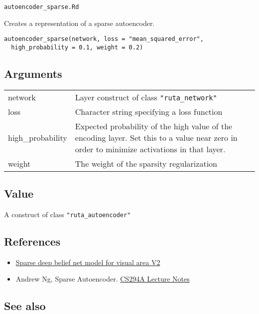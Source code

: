 \texttt{autoencoder\_sparse.Rd}

Creates a representation of a sparse autoencoder.

\begin{verbatim}
autoencoder_sparse(network, loss = "mean_squared_error",
  high_probability = 0.1, weight = 0.2)
\end{verbatim}

\hypertarget{arguments}{\subsection{\texorpdfstring{\protect\hyperlink{arguments}{}Arguments}{Arguments}}\label{arguments}}

\begin{longtable}[c]{@{}ll@{}}
\toprule
network & Layer construct of class
\texttt{"ruta\_network"}\tabularnewline
loss & Character string specifying a loss function\tabularnewline
high\_probability & Expected probability of the high value of the
encoding layer. Set this to a value near zero in order to minimize
activations in that layer.\tabularnewline
weight & The weight of the sparsity regularization\tabularnewline
\bottomrule
\end{longtable}

\hypertarget{value}{\subsection{\texorpdfstring{\protect\hyperlink{value}{}Value}{Value}}\label{value}}

A construct of class \texttt{"ruta\_autoencoder"}

\hypertarget{references}{\subsection{\texorpdfstring{\protect\hyperlink{references}{}References}{References}}\label{references}}

\begin{itemize}
\item
  \href{http://papers.nips.cc/paper/3313-sparse-deep-belief-net-model-for-visual-area-v2}{Sparse
  deep belief net model for visual area V2}
\item
  Andrew Ng, Sparse Autoencoder.
  \href{https://web.stanford.edu/class/cs294a/sparseAutoencoder_2011new.pdf}{CS294A
  Lecture Notes}
\end{itemize}

\hypertarget{see-also}{\subsection{\texorpdfstring{\protect\hyperlink{see-also}{}See
also}{See also}}\label{see-also}}

